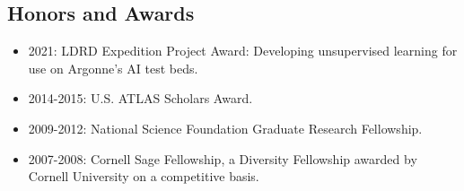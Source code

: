 \documentclass[letter, USenglish, 11pt, subfigure]{article}
\begin{document}
\subsection{Honors and Awards}
\begin{itemize}
\item 2021: LDRD Expedition Project Award: Developing unsupervised learning for use on Argonne's AI test beds.
\item 2014-2015: U.S. ATLAS Scholars Award.
\item 2009-2012: National Science Foundation Graduate Research Fellowship.
\item 2007-2008: Cornell Sage Fellowship, a Diversity Fellowship awarded by Cornell University on a competitive basis.
\end{itemize}

\clearpage




\clearpage
\end{document}
